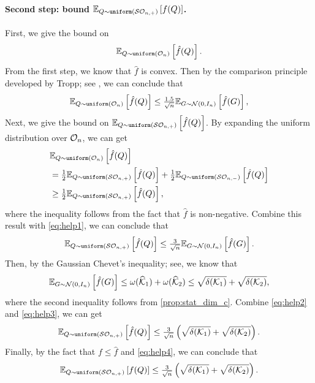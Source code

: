 \paragraph{Second step: bound $\mathbb{E}_{Q \sim \operatorname{\texttt{uniform}}(\mathcal{S}\mathcal{O}_{n, +})}\left[f(Q)\right]$.} 
First, we give the bound on 
\[\mathbb{E}_{Q \sim \operatorname{\texttt{uniform}}(\mathcal{O}_n)}\left[\hat f(Q)\right].\] 
From the first step, we know that $\hat f$ is convex. Then by the comparison principle developed by Tropp; see \citep[Theorem~5 and Lemma~8]{tropp2012comparison}, we can conclude that 
\begin{equation} \label{eq:help1}
  \mathbb{E}_{Q \sim \operatorname{\texttt{uniform}}(\mathcal{O}_n)}\left[\hat f(Q)\right] \leq \tfrac{1.5}{\sqrt{n}}\mathbb{E}_{G\sim\mathcal{N}(0, I_n)}\left[\hat f(G)\right],
\end{equation}
Next, we give the bound on $\mathbb{E}_{Q \sim \operatorname{\texttt{uniform}}(\mathcal{S}\mathcal{O}_{n, +})}\left[\hat f(Q)\right]$. By expanding the uniform distribution over $\mathcal{O}_n$, we can get
\begin{align*}
  &\mathbb{E}_{Q \sim \operatorname{\texttt{uniform}}(\mathcal{O}_n)}\left[\hat f(Q)\right] 
  \\&= \tfrac{1}{2}\mathbb{E}_{Q \sim \operatorname{\texttt{uniform}}(\mathcal{S}\mathcal{O}_{n, +})}\left[\hat f(Q)\right] + \tfrac{1}{2}\mathbb{E}_{Q \sim \operatorname{\texttt{uniform}}(\mathcal{S}\mathcal{O}_{n, -})}\left[\hat f(Q)\right]
  \\&\geq \tfrac{1}{2}\mathbb{E}_{Q \sim \operatorname{\texttt{uniform}}(\mathcal{S}\mathcal{O}_{n, +})}\left[\hat f(Q)\right],
\end{align*}
where the inequality follows from the fact that $\hat f$ is non-negative. Combine this result with \eqref{eq:help1}, we can conclude that 
\begin{equation} \label{eq:help2}
  \mathbb{E}_{Q \sim \operatorname{\texttt{uniform}}(\mathcal{S}\mathcal{O}_{n, +})}\left[\hat f(Q)\right] \leq \tfrac{3}{\sqrt{n}}\mathbb{E}_{G\sim\mathcal{N}(0, I_n)}\left[\hat f(G)\right].
\end{equation}
Then, by the Gaussian Chevet’s inequality; see\citep[Exercise~8.7.4]{vershynin2018high}, we know that 
\begin{equation} \label{eq:help3}
  \mathbb{E}_{G\sim\mathcal{N}(0, I_n)}\left[\hat f(G)\right] \leq \omega(\widehat{\mathcal{K}}_1) + \omega(\widehat{\mathcal{K}}_2) \leq \sqrt{\delta(\mathcal{K}_1)} + \sqrt{\delta(\mathcal{K}_2)},
\end{equation}
where the second inequality follows from \autoref{prop:stat_dim_c}. Combine \eqref{eq:help2} and \eqref{eq:help3}, we can get
\begin{equation} \label{eq:help4}
  \mathbb{E}_{Q \sim \operatorname{\texttt{uniform}}(\mathcal{S}\mathcal{O}_{n, +})}\left[\hat f(Q)\right] \leq \tfrac{3}{\sqrt{n}}\left( \sqrt{\delta(\mathcal{K}_1)} + \sqrt{\delta(\mathcal{K}_2)} \right).
\end{equation}
Finally, by the fact that $f \leq \hat f$ and \eqref{eq:help4}, we can conclude that 
\begin{equation} \label{eq:help5}
  \mathbb{E}_{Q \sim \operatorname{\texttt{uniform}}(\mathcal{S}\mathcal{O}_{n, +})}\left[f(Q)\right] \leq \tfrac{3}{\sqrt{n}}\left( \sqrt{\delta(\mathcal{K}_1)} + \sqrt{\delta(\mathcal{K}_2)} \right).
\end{equation}


